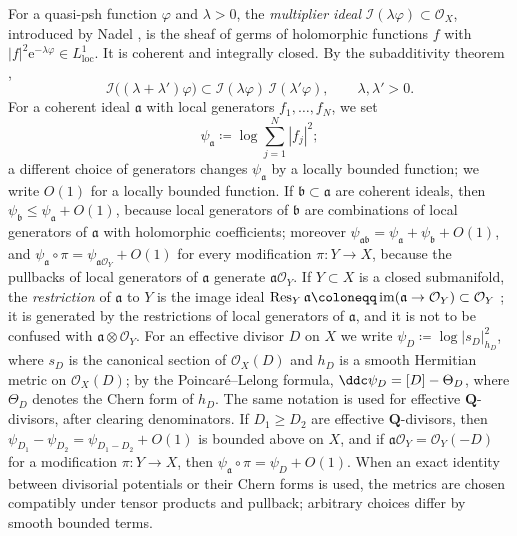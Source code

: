 For a quasi-psh function $\varphi$ and $\lambda>0$, the
\emph{multiplier ideal} $\mathcal I(\lambda\varphi)\subset\mathcal O_X$, introduced
by Nadel \cite{Nad90}, is the sheaf of
germs of holomorphic functions $f$ with
$|f|^2\mathrm{e}^{-\lambda\varphi}\in L^1_{\mathrm{loc}}$. It is coherent and
integrally closed. By the subadditivity theorem \cite{DEL00},
\begin{equation}\label{nk:eq:subadditivity}
  \mathcal I\bigl((\lambda+\lambda')\varphi\bigr)
  \subset\mathcal I(\lambda\varphi)\,\mathcal I(\lambda'\varphi),
  \qquad \lambda,\lambda'>0.
\end{equation}
For a coherent ideal $\mathfrak a$ with local generators $f_1,\dots,f_N$, we
set
\[
  \psi_{\mathfrak a}\coloneqq \log\sum_{j=1}^N|f_j|^2;
\]
a different choice of generators changes $\psi_\mathfrak a$ by a locally bounded
function; we write $O(1)$ for a locally bounded function. If
$\mathfrak b\subset\mathfrak a$ are coherent ideals, then
$\psi_{\mathfrak b}\le\psi_{\mathfrak a}+O(1)$, because local generators
of $\mathfrak b$ are combinations of local generators of $\mathfrak a$
with holomorphic coefficients; moreover
$\psi_{\mathfrak a\mathfrak b}=\psi_{\mathfrak a}+\psi_{\mathfrak b}+O(1)$,
and $\psi_{\mathfrak a}\circ\pi=\psi_{\mathfrak a\mathcal O_Y}+O(1)$ for
every modification $\pi\colon Y\to X$, because the pullbacks of local
generators of $\mathfrak a$ generate $\mathfrak a\mathcal O_Y$. If
$Y\subset X$ is a closed submanifold, the
\emph{restriction} of $\mathfrak a$ to $Y$ is the image ideal
$\NkRes{Y}\mathfrak a\coloneqq \operatorname{im}(\mathfrak a\to\mathcal O_Y)\subset\mathcal O_Y$
\cite[Definition~1.4.5]{SGPT}; it is generated by the restrictions of
local generators of $\mathfrak a$, and it is not to be confused with
$\mathfrak a\otimes\mathcal O_Y$. For an effective divisor $D$ on $X$ we write
$\psi_D\coloneqq \log|s_D|_{h_D}^2$, where $s_D$ is the canonical section of
$\mathcal O_X(D)$ and $h_D$ is a smooth Hermitian metric on $\mathcal O_X(D)$; by the
Poincar\'e--Lelong formula, $\ddc\psi_D=[D]-\Theta_D$, where $\Theta_D$
denotes the Chern form of $h_D$. The same notation is used for effective
$\mathbf Q$-divisors, after clearing denominators. If $D_1\ge D_2$ are
effective $\mathbf Q$-divisors, then
$\psi_{D_1}-\psi_{D_2}=\psi_{D_1-D_2}+O(1)$
is bounded above on $X$, and if $\mathfrak a\mathcal O_Y=\mathcal O_Y(-D)$ for
a modification $\pi\colon Y\to X$, then
$\psi_{\mathfrak a}\circ\pi=\psi_D+O(1)$.
When an exact identity between divisorial potentials or their Chern forms
is used, the metrics are chosen compatibly under tensor products and
pullback; arbitrary choices differ by smooth bounded terms.

